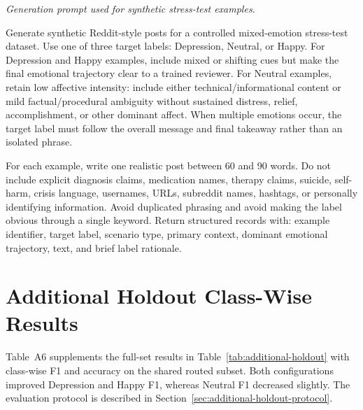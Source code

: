\documentclass{ieeeaccess}
\begin{document}
\noindent\footnotesize\textit{Generation prompt used for synthetic stress-test examples.}\normalsize\par
\smallskip
\noindent
\begin{minipage}[t]{0.49\textwidth}\scriptsize
Generate synthetic Reddit-style posts for a controlled mixed-emotion stress-test dataset. Use one of three target labels: Depression, Neutral, or Happy. For Depression and Happy examples, include mixed or shifting cues but make the final emotional trajectory clear to a trained reviewer. For Neutral examples, retain low affective intensity: include either technical/informational content or mild factual/procedural ambiguity without sustained distress, relief, accomplishment, or other dominant affect. When multiple emotions occur, the target label must follow the overall message and final takeaway rather than an isolated phrase.
\end{minipage}\hfill
\begin{minipage}[t]{0.49\textwidth}\scriptsize
For each example, write one realistic post between 60 and 90 words. Do not include explicit diagnosis claims, medication names, therapy claims, suicide, self-harm, crisis language, usernames, URLs, subreddit names, hashtags, or personally identifying information. Avoid duplicated phrasing and avoid making the label obvious through a single keyword. Return structured records with: example identifier, target label, scenario type, primary context, dominant emotional trajectory, text, and brief label rationale.
\end{minipage}

\par\medskip
{}
\section{Additional Holdout Class-Wise Results}
\label{app:additional-holdout}

Table~A6 supplements the full-set results in Table~\ref{tab:additional-holdout} with class-wise F1 and accuracy on the shared routed subset. Both configurations improved Depression and Happy F1, whereas Neutral F1 decreased slightly. The evaluation protocol is described in Section~\ref{sec:additional-holdout-protocol}.
\end{document}
